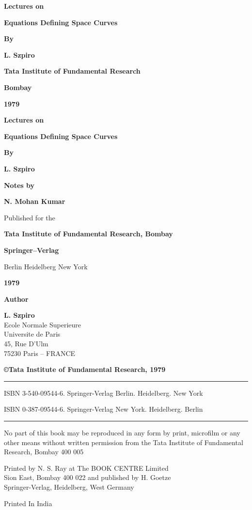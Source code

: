 \thispagestyle{empty}
\begin{center}
{\Large\bf Lectures on}
\medskip

{\Large\bf Equations Defining Space Curves}
\vfill

{\bf By}
\medskip

{\large\bf L. Szpiro}
\vfill

{\bf Tata Institute of Fundamental Research}
\medskip

{\bf Bombay}
\medskip

{\bf 1979}
\end{center}

\eject

\thispagestyle{empty}
\begin{center}
{\Large\bf Lectures on}
\medskip

{\Large\bf Equations Defining Space Curves}
\vfill

{\bf By}
\medskip

{\large\bf L. Szpiro}
\vfill

{\bf Notes by}
\medskip

{\large\bf N. Mohan Kumar}
\vfill

Published for the 
\medskip

{\bf Tata Institute of Fundamental Research, Bombay}
\vfill

{\bf Springer--Verlag}
\medskip

Berlin Heidelberg New York
\medskip

{\bf 1979}

\end{center}

\eject

\thispagestyle{empty}

\begin{center}
{\Large\bf Author}
\medskip

{\large\bf L. Szpiro}\\
Ecole Normale Superieure\\
Universite de Paris\\
45, Rue D'Ulm\\
75230 Paris -- FRANCE
\vfill

{\bf\copyright \quad Tata Institute of Fundamental Research, 1979}
\vfill

\noindent\rule{\textwidth}{1pt}

ISBN 3-540-09544-6. Springer-Verlag Berlin. Heidelberg. New York

ISBN 0-387-09544-6. Springer-Verlag New York. Heidelberg. Berlin

\noindent\rule{\textwidth}{1pt}

\vfill

\parbox{0.7\textwidth}{No part of this book may be reproduced in any
  form by print, microfilm or any other means without
written permission from the Tata Institute of
Fundamental Research, Bombay 400 005}
\vfill

Printed by N. S. Ray at The BOOK CENTRE Limited \\
Sion East, Bombay 400 022 and published by H. Goetze\\
Springer-Verlag, Heidelberg, West Germany
\vfill


Printed In India
\end{center}

